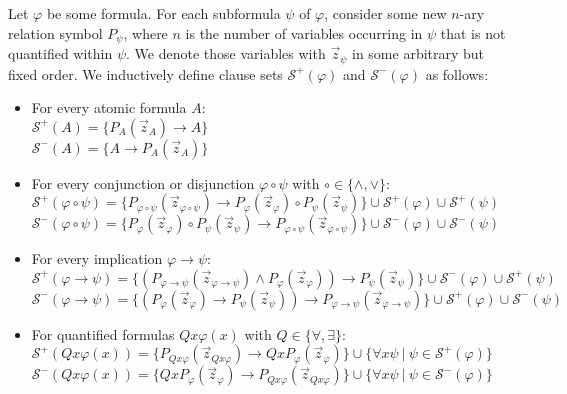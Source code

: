 \documentclass[runningheads]{llncs}
\begin{document}
\begin{definition}
Let $\varphi$ be some formula. For each subformula $\psi$ of $\varphi$, consider some new $n$-ary relation symbol $P_\psi$, where $n$ is the number of variables occurring in $\psi$ that is not quantified within $\psi$. We denote those variables with $\vec z_\psi$ in some arbitrary but fixed order. We inductively define clause sets $\mathcal S^+(\varphi)$ and $\mathcal S^-(\varphi)$ as follows:
	\begin{itemize}
		\item For every atomic formula $A$:\\
$\mathcal S^+(A) = \{P_A(\vec z_A)\to A\}$\\$\mathcal S^-(A) = \{A\to P_A(\vec z_A)\}$
		\item For every conjunction or disjunction $\varphi\circ\psi$ with $\circ\in\{\wedge,\vee\}$:\\
$\mathcal S^+(\varphi\circ\psi) = \{P_{\varphi\circ\psi}(\vec z_{\varphi\circ\psi})\to P_{\varphi}(\vec z_\varphi)\circ P_{\psi}(\vec z_\psi)\}\cup \mathcal S^+(\varphi)\cup \mathcal S^+(\psi)$\\$\mathcal S^-(\varphi\circ\psi) =\{P_{\varphi}(\vec z_\varphi)\circ P_{\psi}(\vec z_\psi)\to P_{\varphi\circ\psi}(\vec z_{\varphi\circ\psi})\}\cup \mathcal S^-(\varphi)\cup \mathcal S^-(\psi)$
		\item For every implication $\varphi \to\psi$:\\
$\mathcal S^+(\varphi\to\psi) = \{(P_{\varphi\to\psi}(\vec z_{\varphi\to\psi})\wedge P_{\varphi}(\vec z_\varphi))\to P_{\psi}(\vec z_\psi)\}\cup \mathcal S^-(\varphi)\cup \mathcal S^+(\psi)$\\$\mathcal S^-(\varphi\to\psi)  = \{(P_{\varphi}(\vec z_\varphi)\to P_{\psi}(\vec z_\psi))\to P_{\varphi\to\psi}(\vec z_{\varphi\to\psi})\}\cup \mathcal S^+(\varphi)\cup \mathcal S^-(\psi)$
		\item For quantified formulas $Qx\varphi(x)$ with $Q\in \{\forall,\exists\}$:\\
$\mathcal S^+(Qx\varphi(x)) = \{P_{Qx\varphi}(\vec z_{Qx\varphi})\to QxP_{\varphi}(\vec z_{\varphi})\}\cup \{\forall x\psi\:|\:\psi\in\mathcal S^+(\varphi)\}$\\$\mathcal S^-(Qx\varphi(x))  = \{QxP_{\varphi}(\vec z_{\varphi})\to P_{Qx\varphi}(\vec z_{Qx\varphi})\}\cup \{\forall x\psi\:|\:\psi\in\mathcal S^-(\varphi)\}$
	\end{itemize}
\end{definition}
\end{document}
